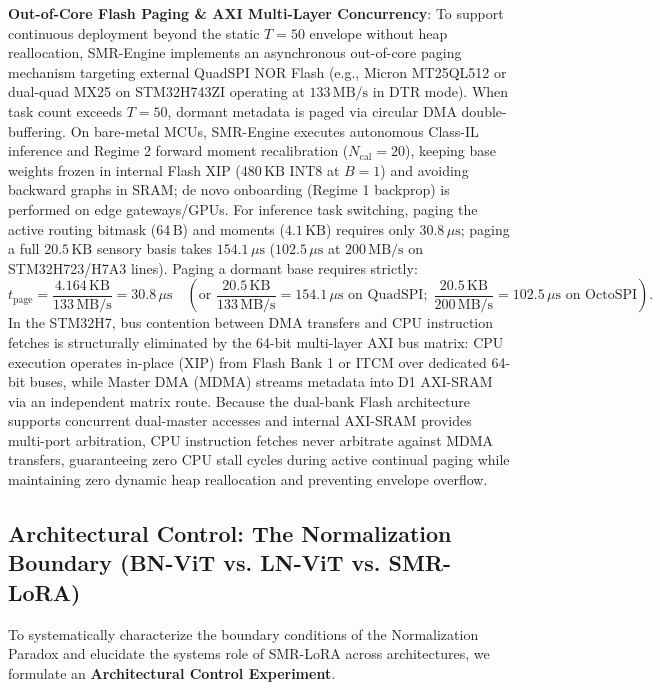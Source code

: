\documentclass{article}
\begin{document}
\noindent\textbf{Out-of-Core Flash Paging \& AXI Multi-Layer Concurrency}: To support continuous deployment beyond the static $T=50$ envelope without heap reallocation, SMR-Engine implements an asynchronous out-of-core paging mechanism targeting external QuadSPI NOR Flash (e.g., Micron MT25QL512 or dual-quad MX25 on STM32H743ZI operating at $133\,\text{MB/s}$ in DTR mode). When task count exceeds $T=50$, dormant metadata is paged via circular DMA double-buffering. On bare-metal MCUs, SMR-Engine executes autonomous Class-IL inference and Regime 2 forward moment recalibration ($N_{\mathrm{cal}}=20$), keeping base weights frozen in internal Flash XIP ($480\,\text{KB}$ INT8 at $B=1$) and avoiding backward graphs in SRAM; de novo onboarding (Regime 1 backprop) is performed on edge gateways/GPUs. For inference task switching, paging the active routing bitmask ($64\,\text{B}$) and moments ($4.1\,\text{KB}$) requires only $30.8\,\mu\text{s}$; paging a full $20.5\,\text{KB}$ sensory basis takes $154.1\,\mu\text{s}$ ($102.5\,\mu\text{s}$ at $200\,\text{MB/s}$ on STM32H723/H7A3 lines). Paging a dormant base requires strictly:
\begin{equation}
    t_{\text{page}} = \frac{4.164\,\text{KB}}{133\,\text{MB/s}} = 30.8\,\mu\text{s} \quad \left(\text{or } \frac{20.5\,\text{KB}}{133\,\text{MB/s}} = 154.1\,\mu\text{s} \text{ on QuadSPI}; \; \frac{20.5\,\text{KB}}{200\,\text{MB/s}} = 102.5\,\mu\text{s} \text{ on OctoSPI}\right).
\end{equation}
In the STM32H7, bus contention between DMA transfers and CPU instruction fetches is structurally eliminated by the 64-bit multi-layer AXI bus matrix: CPU execution operates in-place (XIP) from Flash Bank 1 or ITCM over dedicated 64-bit buses, while Master DMA (MDMA) streams metadata into D1 AXI-SRAM via an independent matrix route. Because the dual-bank Flash architecture supports concurrent dual-master accesses and internal AXI-SRAM provides multi-port arbitration, CPU instruction fetches never arbitrate against MDMA transfers, guaranteeing zero CPU stall cycles during active continual paging while maintaining zero dynamic heap reallocation and preventing envelope overflow.

\subsection{Architectural Control: The Normalization Boundary (BN-ViT vs. LN-ViT vs. SMR-LoRA)}
\label{sec:app_norm_boundary_vit}
To systematically characterize the boundary conditions of the Normalization Paradox and elucidate the systems role of SMR-LoRA across architectures, we formulate an \textbf{Architectural Control Experiment}.
\end{document}
